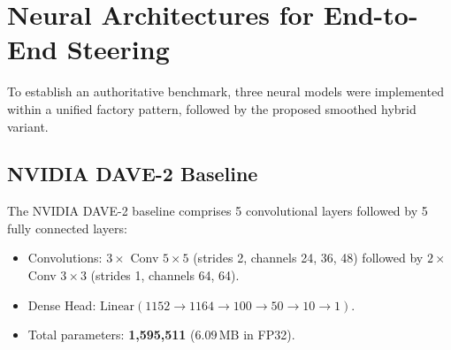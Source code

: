 \documentclass[10pt,journal,compsoc]{IEEEtran}
\begin{document}
\section{Neural Architectures for End-to-End Steering}

To establish an authoritative benchmark, three neural models were implemented within a unified factory pattern, followed by the proposed smoothed hybrid variant.

\begin{table}[t]
\caption{Architectural Specifications and Edge Execution Performance Benchmark}
\label{tab:architectures}
\centering
{}
\end{table}

\subsection{NVIDIA DAVE-2 Baseline}
The NVIDIA DAVE-2 baseline comprises 5 convolutional layers followed by 5 fully connected layers:
\begin{itemize}
    \item Convolutions: $3 \times$ Conv $5 \times 5$ (strides 2, channels 24, 36, 48) followed by $2 \times$ Conv $3 \times 3$ (strides 1, channels 64, 64).
    \item Dense Head: $\text{Linear}(1152 \to 1164 \to 100 \to 50 \to 10 \to 1)$.
    \item Total parameters: \textbf{1,595,511} ($6.09$\,MB in FP32).
\end{itemize}
\end{document}
